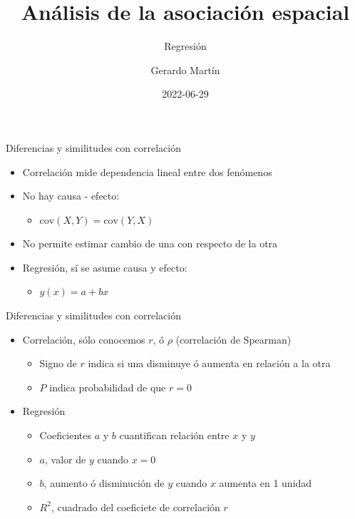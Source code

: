 \documentclass[
  11pt,
  ignorenonframetext,
]{beamer}
\title{Análisis de la asociación espacial}
\subtitle{Regresión}
\author{Gerardo Martín}
\date{2022-06-29}
\providecommand{\tightlist}{%
  \setlength{\itemsep}{0pt}\setlength{\parskip}{0pt}}
\begin{document}
\frame{\titlepage}

\begin{frame}{Diferencias y similitudes con correlación}
\protect\hypertarget{diferencias-y-similitudes-con-correlaciuxf3n}{}
\begin{itemize}
\item
  Correlación mide dependencia lineal entre dos fenómenos
\item
  No hay causa - efecto:

  \begin{itemize}
  \tightlist
  \item
    \(\mathrm{cov}(X, Y) = \mathrm{cov}(Y, X)\)
  \end{itemize}
\item
  No permite estimar cambio de una con respecto de la otra
\item
  Regresión, sí se asume causa y efecto:

  \begin{itemize}
  \tightlist
  \item
    \(y(x) = a + bx\)
  \end{itemize}
\end{itemize}
\end{frame}

\begin{frame}{Diferencias y similitudes con correlación}
\protect\hypertarget{diferencias-y-similitudes-con-correlaciuxf3n-1}{}
\begin{itemize}
\item
  Correlación, sólo conocemos \(r\), ó \(\rho\) (correlación de
  Spearman)

  \begin{itemize}
  \item
    Signo de \(r\) indica si una disminuye ó aumenta en relación a la
    otra
  \item
    \(P\) indica probabilidad de que \(r = 0\)
  \end{itemize}
\item
  Regresión

  \begin{itemize}
  \item
    Coeficientes \(a\) y \(b\) cuantifican relación entre \(x\) y \(y\)
  \item
    \(a\), valor de \(y\) cuando \(x = 0\)
  \item
    \(b\), aumento ó disminución de \(y\) cuando \(x\) aumenta en 1
    unidad
  \item
    \(R^2\), cuadrado del coeficiete de correlación \(r\)
  \end{itemize}
\end{itemize}
\end{frame}
\end{document}
